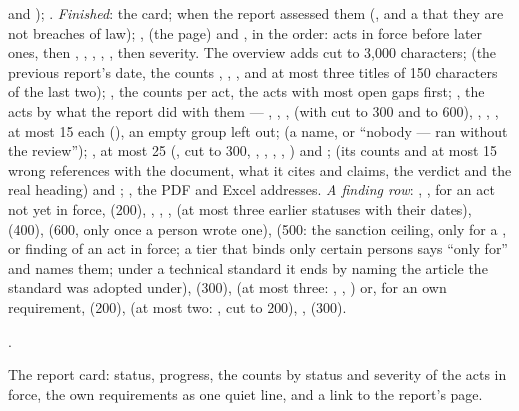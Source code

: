 \begin{description}[style=multiline, leftmargin=19mm, labelwidth=17mm, labelsep=2mm,
  font=\sffamily\bfseries\footnotesize\color{ink}, itemsep=1pt, topsep=2pt, before=\raggedright]
    and ); .
    \emph{Finished}: the card;  when the report assessed them
    (,  and a  that they are not breaches of
    law); ,  (the page) and , in
    the order: acts in force before later ones, then , ,
    , , , then severity. The overview adds
     cut to 3,000 characters;  (the previous report's date,
    the counts , , , and at most three titles of 150
    characters of the last two); , the counts per act, the acts with most open gaps
    first; , the acts by what the report did with them --- ,
    , ,  (with  cut to 300 and
     to 600), , ,
    , at most 15 each (), an empty group left out;
     (a name, or \enquote{nobody --- ran without the review});
    , at most 25 (,  cut to 300, ,
    , , , ) and
    ;  (its counts and at most 15 wrong references with
    the document, what it cites and claims, the verdict and the real heading) and
    ; , the PDF and Excel addresses.
    \emph{A finding row}: , ,  for an act not yet in
    force,  (200), , , ,
     (at most three earlier statuses with their dates),  (400),
     (600, only once a person wrote one),  (500: the sanction
    ceiling, only for a ,  or  finding of an act in
    force; a tier that binds only certain persons says \enquote{only for} and names them; under
    a technical standard it ends by naming the article the standard was adopted under),  (300),  (at most three: ,
    , ) or, for an own requirement,  (200),
     (at most two: ,  cut to 200), ,
     (300).
  \item[Errors] .
  \item[Console] The report card: status, progress, the counts by status and severity of the
    acts in force, the own requirements as one quiet line, and a link to the report's page.
\end{description}

